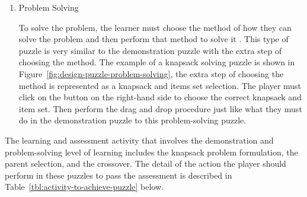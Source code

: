 \documentclass[12pt,oneside,openright,a4paper]{cpe-english-project}
\begin{document}
\begin{enumerate}
	\item Problem Solving \\
	\begin{minipage}[c]{\textwidth}\centering
	\label{fig:design-puzzle-problem-solving}
	\end{minipage}
	To solve the problem, the learner must choose the method of how they can solve the problem and then perform that method to solve it \cite{eberly2022why}. This type of puzzle is very similar to the demonstration puzzle with the extra step of choosing the method. The example of a knapsack solving puzzle is shown in Figure~\ref{fig:design-puzzle-problem-solving}, the extra step of choosing the method is represented as a knapsack and items set selection. The player must click on the button on the right-hand side to choose the correct knapsack and item set. Then perform the drag and drop procedure just like what they must do in the demonstration puzzle to this problem-solving puzzle.
\end{enumerate}

The learning and assessment activity that involves the demonstration and problem-solving level of learning includes the knapsack problem formulation, the parent selection, and the crossover. The detail of the action the player should perform in these puzzles to pass the assessment is described in Table~\ref{tbl:activity-to-achieve-puzzle} below.
\end{document}
